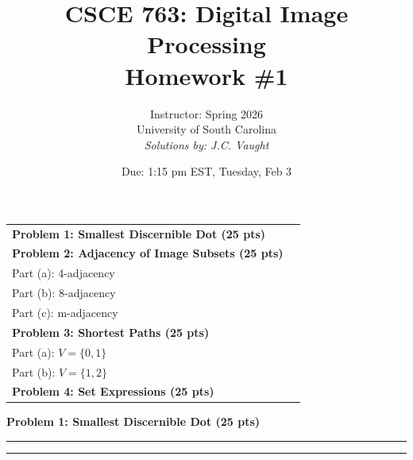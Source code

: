 \documentclass[12pt]{article}
\title{CSCE 763: Digital Image Processing \\ Homework \#1}
\author{Instructor: Spring 2026 \\ University of South Carolina \\ \textit{Solutions by: J.C. Vaught}}
\date{Due: 1:15 pm EST, Tuesday, Feb 3}
\newcommand{\question}[1]{%
  \clearpage
  \vspace{0.5cm}
  {\noindent\normalsize \textbf{#1}}
  \vspace{0.2cm}
  \hrule
  \vspace{0.1cm}
  \hrule
  \vspace{0.3cm}
}
\begin{document}
\maketitle
\setlength{\parindent}{0pt}



\begin{center}
\begin{tcolorbox}[colback=white, colframe=gray!50!black, colbacktitle=gray!20!white,
                  coltitle=black, sharp corners, boxrule=1pt,
                  title=\Large\bfseries Table of Contents]
\begin{tabular}{p{}r}
\textbf{Problem 1: Smallest Discernible Dot (25 pts)} \dotfill & \textbf{\pageref{quest:1}} \\[0.3em]
\textbf{Problem 2: Adjacency of Image Subsets (25 pts)} & \\
\quad Part (a): 4-adjacency \dotfill & \textbf{\pageref{quest:2}} \\
\quad Part (b): 8-adjacency \dotfill & \textbf{\pageref{quest:2}} \\
\quad Part (c): m-adjacency \dotfill & \textbf{\pageref{quest:2}} \\[0.3em]
\textbf{Problem 3: Shortest Paths (25 pts)} & \\
\quad Part (a): $V = \{0, 1\}$ \dotfill & \textbf{\pageref{quest:3}} \\
\quad Part (b): $V = \{1, 2\}$ \dotfill & \textbf{\pageref{quest:3}} \\[0.3em]
\textbf{Problem 4: Set Expressions (25 pts)} \dotfill & \textbf{\pageref{quest:4}} \\
\end{tabular}
\vspace{0.2cm}
\end{tcolorbox}
\end{center}

\vspace{0.5cm}


\question{Problem 1: Smallest Discernible Dot (25 pts)}\label{quest:1}
\end{document}
